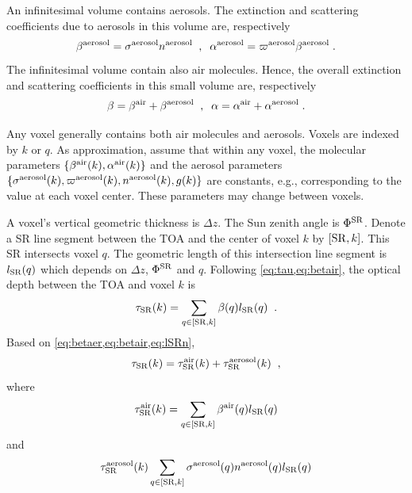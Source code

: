 \documentclass[10pt,letterpaper]{article}
\begin{document}
An infinitesimal volume contains aerosols. The extinction and
scattering coefficients due to aerosols in this volume are,
respectively
\begin{equation}
  \beta^{\rm aerosol}=\sigma^{\rm aerosol} n^{\rm aerosol}
  \;\;,\;\;
  \alpha^{\rm aerosol}=\varpi^{\rm aerosol} \beta^{\rm aerosol}
  \;.
  \label{eq:betaer}
\end{equation}
The infinitesimal volume contain also air molecules. Hence, the
overall extinction and scattering coefficients in this small volume
are, respectively
\begin{equation}
  \beta=\beta^{\rm air}+\beta^{\rm aerosol}
  \;\;,\;\;
  \alpha=\alpha^{\rm air}+\alpha^{\rm aerosol}
  \;.
  \label{eq:betair}
\end{equation}

Any voxel generally contains both air molecules and aerosols. Voxels
are indexed by $k$ or $q$. As approximation, assume that within any
voxel, the molecular parameters $\{ \beta^{\rm air}(k),\alpha^{\rm
  air}(k)\}$ and the aerosol parameters $\{ \sigma^{\rm
  aerosol}(k),\varpi^{\rm aerosol}(k), n^{\rm aerosol}(k),g(k)\}$ are
constants, e.g., corresponding to the value at each voxel
center. These parameters may change between voxels.

A voxel's vertical geometric thickness is $\Delta z$.  The Sun zenith
angle is $\Phi^{\rm SR}$. Denote a SR line segment between the TOA and
the center of voxel $k$ by $[{\rm SR},k]$. This SR intersects voxel
$q$. The geometric length of this intersection line segment is $l_{\rm
  SR}(q)$ which depends on $\Delta z$, $\Phi^{\rm SR}$ and $q$.
Following \cref{eq:tau,eq:betair}, the optical depth between the TOA
and voxel $k$ is
\begin{equation}
  \tau_{\rm SR}(k)= \sum_{q \in[{\rm SR},k]} \beta(q) l_{\rm SR}(q) \;\;.
  \label{eq:lSRn}
\end{equation}
Based on \cref{eq:betaer,eq:betair,eq:lSRn},
\begin{equation}
  \tau_{\rm SR}(k)=
  \tau_{\rm SR}^{\rm air}(k) +  \tau_{\rm SR}^{\rm aerosol}(k)
  \;\;,
  \label{eq:lSRaa}
\end{equation}
where
\begin{equation}
  \tau_{\rm SR}^{\rm air}(k)=
  \sum_{q \in[{\rm SR},k]}
  \beta^{\rm air}(q)  l_{\rm SR}(q)
  \label{eq:lSRair}
\end{equation}
and
\begin{equation}
  \tau_{\rm SR}^{\rm aerosol}(k)
  \sum_{q \in[{\rm SR},k]}
  \sigma^{\rm aerosol}(q) n^{\rm aerosol}(q) l_{\rm SR}(q)
  \label{eq:lSRaeros}
\end{equation}
\end{document}
